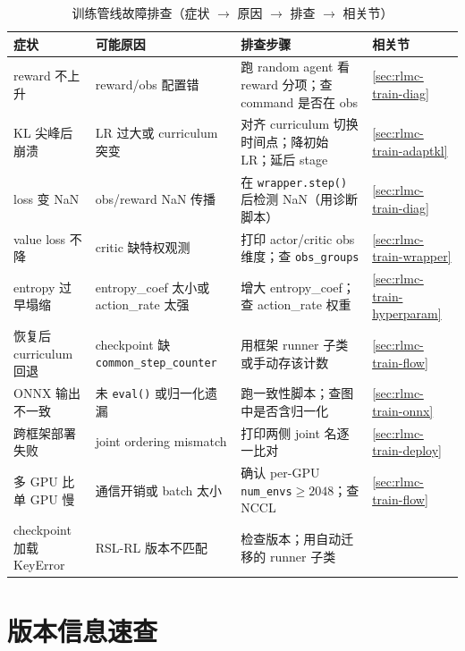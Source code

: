 \begin{table}[H]
\centering
\caption{训练管线故障排查（症状 $\to$ 原因 $\to$ 排查 $\to$ 相关节）}
\label{tab:rlmc-train-trouble}
\begin{tabular}{p{3.0cm}p{3.0cm}p{4.2cm}p{2.2cm}}
\hline
症状 & 可能原因 & 排查步骤 & 相关节 \\
\hline
reward 不上升 & reward/obs 配置错 & 跑 random agent 看 reward 分项；查 command 是否在 obs & \cref{sec:rlmc-train-diag} \\
KL 尖峰后崩溃 & LR 过大或 curriculum 突变 & 对齐 curriculum 切换时间点；降初始 LR；延后 stage & \cref{sec:rlmc-train-adaptkl} \\
loss 变 NaN & obs/reward NaN 传播 & 在 \verb|wrapper.step()| 后检测 NaN（用诊断脚本） & \cref{sec:rlmc-train-diag} \\
value loss 不降 & critic 缺特权观测 & 打印 actor/critic obs 维度；查 \verb|obs_groups| & \cref{sec:rlmc-train-wrapper} \\
entropy 过早塌缩 & entropy\_coef 太小或 action\_rate 太强 & 增大 entropy\_coef；查 action\_rate 权重 & \cref{sec:rlmc-train-hyperparam} \\
恢复后 curriculum 回退 & checkpoint 缺 \verb|common_step_counter| & 用框架 runner 子类或手动存该计数 & \cref{sec:rlmc-train-flow} \\
ONNX 输出不一致 & 未 \verb|eval()| 或归一化遗漏 & 跑一致性脚本；查图中是否含归一化 & \cref{sec:rlmc-train-onnx} \\
跨框架部署失败 & joint ordering mismatch & 打印两侧 joint 名逐一比对 & \cref{sec:rlmc-train-deploy} \\
多 GPU 比单 GPU 慢 & 通信开销或 batch 太小 & 确认 per-GPU \verb|num_envs|$\ge2048$；查 NCCL & \cref{sec:rlmc-train-flow} \\
checkpoint 加载 KeyError & RSL-RL 版本不匹配 & 检查版本；用自动迁移的 runner 子类 & \nameref{sec:rlmc-train-setup} \\
\hline
\end{tabular}
\end{table}

\section*{版本信息速查}
\label{sec:rlmc-train-versioninfo}

